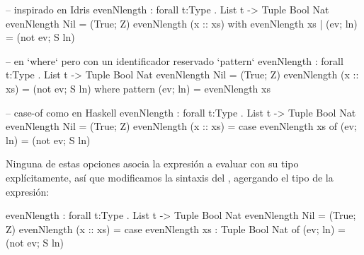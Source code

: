 {\begin{designfr}
\begin{anglercode}[morekeywords={pattern}]
-- inspirado en Idris
evenNlength : forall t:Type . List t -> Tuple Bool Nat
evenNlength Nil = (True; Z)
evenNlength (x :: xs)
    with evenNlength xs
        | (ev; ln) = (not ev; S ln)

-- en `where` pero con un identificador reservado `pattern`
evenNlength : forall t:Type . List t -> Tuple Bool Nat
evenNlength Nil = (True; Z)
evenNlength (x :: xs) = (not ev; S ln)
    where
        pattern (ev; ln) = evenNlength xs

-- case-of como en Haskell
evenNlength : forall t:Type . List t -> Tuple Bool Nat
evenNlength Nil = (True; Z)
evenNlength (x :: xs) =
    case evenNlength xs of
        (ev; ln) = (not ev; S ln)
\end{anglercode}

Ninguna de estas opciones asocia la expresión a evaluar con su tipo explícitamente, así que modificamos la sintaxis del , agergando el tipo de la expresión:

\begin{anglercode}
evenNlength : forall t:Type . List t -> Tuple Bool Nat
evenNlength Nil = (True; Z)
evenNlength (x :: xs) =
    case evenNlength xs : Tuple Bool Nat of
        (ev; ln) = (not ev; S ln)
\end{anglercode}
\end{designfr}

}
